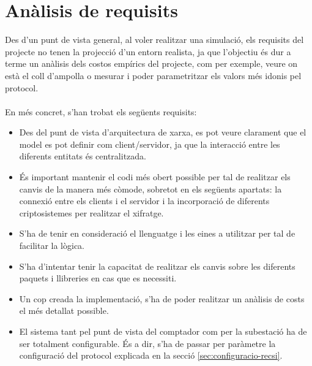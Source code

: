 \newcommand{\java}{Java 8}
\newcommand{\mavenLarge}{Apache Maven 3.6.3}
\newcommand{\maven}{\texttt{maven} }
\newcommand{\ciglib}{\texttt{CigLib} }
\newcommand{\toml}{\texttt{Toml}}


\section{Anàlisis de requisits}
Des d'un punt de vista general, al voler realitzar una simulació, els requisits del projecte no tenen la projecció d'un entorn realista, ja que l'objectiu és dur a terme un anàlisis dels costos empírics del projecte, com per exemple, veure on està el coll d'ampolla o mesurar i poder parametritzar els valors més idonis pel protocol.
\\
\\
En més concret, s'han trobat els següents requisits:
\begin{itemize}
	\item Des del punt de vista d'arquitectura de xarxa, es pot veure clarament que el model es pot definir com client/servidor, ja que la interacció entre les diferents entitats és centralitzada.
	\item És important mantenir el codi més obert possible per tal de realitzar els canvis de la manera més còmode, sobretot en els següents apartats: la connexió entre els clients i el servidor i la incorporació de diferents criptosistemes per realitzar el xifratge.
	\item S'ha de tenir en consideració el llenguatge i les eines a utilitzar per tal de facilitar la lògica.
	\item S'ha d'intentar tenir la capacitat de realitzar els canvis sobre les diferents paquets i llibreries en cas que es necessiti.
	\item Un cop creada la implementació, s'ha de poder realitzar un anàlisis de costs el més detallat possible.
	\item El sistema tant pel punt de vista del comptador com per la subestació ha de ser totalment configurable. És a dir, s'ha de passar per paràmetre la configuració del protocol explicada en la secció \ref{sec:configuracio-recsi}.
\end{itemize}
